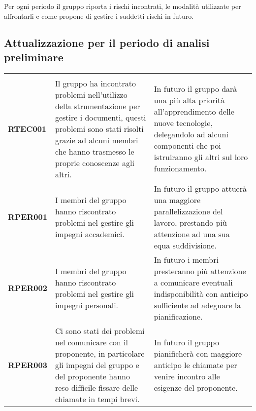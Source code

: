 \documentclass[../piano-di-progetto]{subfiles}
\begin{document}
Per ogni periodo il gruppo riporta i rischi incontrati, le modalità utilizzate per affrontarli e come propone di gestire i suddetti rischi in futuro.

\subsection{Attualizzazione per il periodo di analisi preliminare}%
\label{sub:attualizzazione_periodo_analisi_preliminare}
\begin{longtable}[H]{|p{10em}|p{17em}|p{17em}|}
  \rowcolor{darkgray!90!}
  \multicolumn{1}{c}{\color{white}{\textbf{Rischio}}} & \multicolumn{1}{c}{\color{white}{\textbf{Gestione}}}                                                                                                                                                          & \multicolumn{1}{c}{\color{white}{\textbf{Monitoraggio}}}                                                                                                                        \\
  \textbf{RTEC001}                                    & Il gruppo ha incontrato problemi nell'utilizzo della strumentazione per gestire i documenti, questi problemi sono stati risolti grazie ad alcuni membri che hanno trasmesso le proprie conoscenze agli altri. & In futuro il gruppo darà una più alta priorità all'apprendimento delle nuove tecnologie, delegandolo ad alcuni componenti che poi istruiranno gli altri sul loro funzionamento. \\
  \textbf{RPER001}                                    & I membri del gruppo hanno riscontrato problemi nel gestire gli impegni accademici.                                                                                                                            & In futuro il gruppo attuerà una maggiore parallelizzazione del lavoro, prestando più attenzione ad una sua equa suddivisione.                                                   \\
  \textbf{RPER002}                                    & I membri del gruppo hanno riscontrato problemi nel gestire gli impegni personali.                                                                                                                             & In futuro i membri presteranno più attenzione a comunicare eventuali indisponibilità con anticipo sufficiente ad adeguare la pianificazione.                                    \\
  \textbf{RPER003}                                    & Ci sono stati dei problemi nel comunicare con il proponente, in particolare gli impegni del gruppo e del proponente hanno reso difficile fissare delle chiamate in tempi brevi.                               & In futuro il gruppo pianificherà con maggiore anticipo le chiamate per venire incontro alle esigenze del proponente.                                                            \\

\end{longtable}
\end{document}
